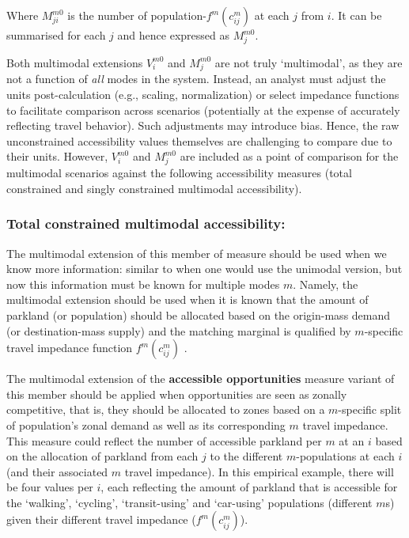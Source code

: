 \documentclass[
11pt, %
oneside, %
english, %
singlespacing, %
]{macthesis} %
\begin{document}
Where \(M^{m0}_{ji}\) is the number of population-\(f^m(c^{m}_{ij})\) at each \(j\) from \(i\). It can be summarised for each \(j\) and hence expressed as \(M^{m0}_j\).

Both multimodal extensions \(V^{m0}_{i}\) and \(M^{m0}_{j}\) are not truly `multimodal', as they are not a function of \emph{all} modes in the system. Instead, an analyst must adjust the units post-calculation (e.g., scaling, normalization) or select impedance functions to facilitate comparison across scenarios (potentially at the expense of accurately reflecting travel behavior). Such adjustments may introduce bias. Hence, the raw unconstrained accessibility values themselves are challenging to compare due to their units. However, \(V^{m0}_{i}\) and \(M^{m0}_{j}\) are included as a point of comparison for the multimodal scenarios against the following accessibility measures (total constrained and singly constrained multimodal accessibility).

\subsubsection{Total constrained multimodal accessibility:}\label{total-constrained-multimodal-accessibility}

The multimodal extension of this member of measure should be used when we know more information: similar to when one would use the unimodal version, but now this information must be known for multiple modes \(m\). Namely, the multimodal extension should be used when it is known that the amount of parkland (or population) should be allocated based on the origin-mass demand (or destination-mass supply) and the matching marginal is qualified by \(m\)-specific travel impedance function \(f^m(c^m_{ij})\) .

The multimodal extension of the \textbf{accessible opportunities} measure variant of this member should be applied when opportunities are seen as zonally competitive, that is, they should be allocated to zones based on a \(m\)-specific split of population's zonal demand as well as its corresponding \(m\) travel impedance. This measure could reflect the number of accessible parkland per \(m\) at an \(i\) based on the allocation of parkland from each \(j\) to the different \(m\)-populations at each \(i\) (and their associated \(m\) travel impedance). In this empirical example, there will be four values per \(i\), each reflecting the amount of parkland that is accessible for the `walking', `cycling', `transit-using' and `car-using' populations (different \(m\)s) given their different travel impedance (\(f^m(c^m_{ij})\)).
\end{document}

